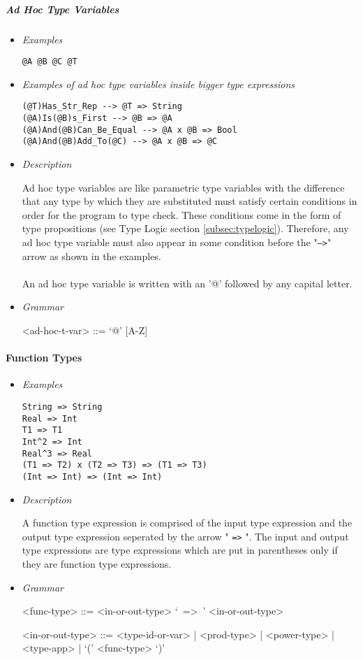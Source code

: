 \documentclass{article}
\begin{document}
\subparagraph{Ad Hoc Type Variables}

\begin{itemize}
\item \textit{Examples}
\begin{verbatim}
@A @B @C @T
\end{verbatim}

\item \textit{Examples of ad hoc type variables inside bigger type expressions}
\begin{verbatim}
(@T)Has_Str_Rep --> @T => String
(@A)Is(@B)s_First --> @B => @A
(@A)And(@B)Can_Be_Equal --> @A x @B => Bool
(@A)And(@B)Add_To(@C) --> @A x @B => @C
\end{verbatim}

\item \textit{Description}

Ad hoc type variables are like parametric type variables with the difference
that any type by which they are substituted must satisfy certain conditions in
order for the program to type check. These conditions come in the form of type
propositions (see Type Logic section \ref{subsec:typelogic}). Therefore, any ad
hoc type variable must also appear in some condition before the "\texttt{-->}"
arrow as shown in the examples.
\\\\
An ad hoc type variable is written with an '@' followed by any capital letter.

\item \textit{Grammar}
\begin{grammar}
<ad-hoc-t-var> ::= `@' [A-Z] 
\end{grammar}
\end{itemize}

\paragraph{Function Types}

\begin{itemize}
\item \textit{Examples}
\begin{verbatim}
String => String 
Real => Int
T1 => T1
Int^2 => Int
Real^3 => Real
(T1 => T2) x (T2 => T3) => (T1 => T3)
(Int => Int) => (Int => Int)
\end{verbatim}

\item \textit{Description}

A function type expression is comprised of the input type expression and the
output type expression seperated by the arrow " \texttt{=>} ". The input and output
type expressions are type expressions which are put in parentheses only if they are
function type expressions. 

\item \textit{Grammar}
\begin{grammar}
<func-type> ::= <in-or-out-type> `\ =>\ ' <in-or-out-type>

<in-or-out-type> ::=
<type-id-or-var> | <prod-type> | <power-type> | <type-app> | `(' <func-type> `)'
\end{grammar}
\end{itemize}
\end{document}
